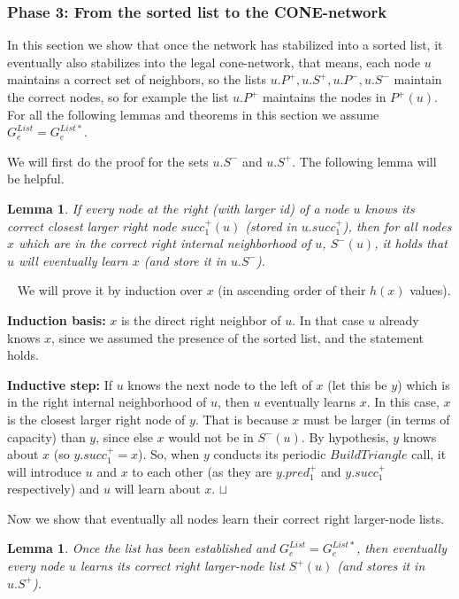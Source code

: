 \documentclass[11pt]{article}
\newtheorem{lemma}[theorem]{Lemma}
\newcommand{\sq}{\hbox{\rlap{$\sqcap$}$\sqcup$}}
\newcommand{\qed}{\hspace*{\fill}\sq}
\newenvironment{proof}{\noindent {\bf Proof.}\ }{\qed\par\vskip 4mm\par}
\begin{document}
\subsubsection{Phase 3: From the sorted list to the CONE-network}

In this section we show that once the network has stabilized into a sorted list, it eventually also stabilizes into the legal cone-network, that means,
each node $u$ maintains a correct set of neighbors, so the lists $u.P^+,u.S^+,u.P^-,u.S^-$ maintain the correct nodes, so for example the list $u.P^+$ maintains
the nodes in $P^+(u)$. For all the following lemmas and theorems in this section we assume $G^{List}_e=G^{List*}_e$.

We will first do the proof for the sets $u.S^-$ and $u.S^+$.
The following lemma will be helpful.

\begin{lemma}\label{induct1}
If every node at the right (with larger id) of a node $u$ knows its correct closest larger right node $succ^+_1(u)$ (stored in $u.succ^+_1$), then for all nodes $x$ which are in the correct right internal neighborhood  of $u$, $S^-(u)$, it holds that $u$ will eventually learn $x$ (and store it in $u.S^-$).
\end{lemma}

\begin{proof}
We will prove it by induction over $x$ (in ascending order of their $h(x)$ values).

\textbf{Induction basis:} $x$ is the direct right neighbor of $u$.  In that case $u$ already knows $x$, since we assumed the presence of the sorted list, and the statement holds.

\textbf{Inductive step:} If $u$ knows the next node to the left of $x$ (let this be $y$) which is in the right internal neighborhood of $u$, then $u$ eventually learns $x$.
In this case, $x$ is the closest larger right node of $y$. That is because $x$ must be larger (in terms of capacity) than $y$, since else $x$ would not
be in $S^-(u)$. By hypothesis, $y$ knows about $x$ (so $y.succ^+_1=x$). So, when $y$ conducts its periodic $BuildTriangle$ call, it will introduce $u$ and $x$ to each other (as they are $y.pred^+_1$ and $y.succ^+_1$ respectively)
and $u$ will learn about $x$.
\end{proof}


Now we show that eventually all nodes learn their correct right larger-node lists.


\begin{lemma}\label{S^+}
Once the list has been established and $G^{List}_e=G^{List*}_e$, then eventually every node $u$ learns its correct right larger-node list $S^+(u)$ (and stores it in $u.S^+$).
\end{lemma}
\end{document}
